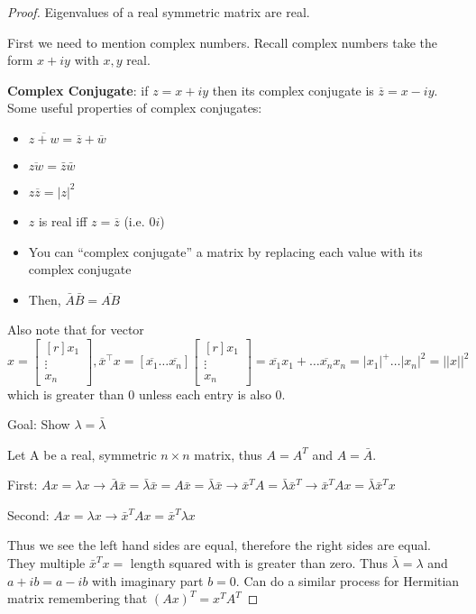 \begin{proof}
    Eigenvalues of a real symmetric matrix are real.

    First we need to mention complex numbers. Recall complex numbers take the form $x+iy$ with $x,y$ real.

    \begin{definition}
        \textbf{Complex Conjugate}: if $z=x+iy$ then its complex conjugate is $ \overline{z}=x-iy$. Some useful properties of complex conjugates:
        \begin{itemize}
            \item $\overline{z+w}= \overline{z}+ \overline{w}$
            \item $\overline{zw}= \bar{z} \bar{w}$
            \item $z \overline{z}=|z|^2$
            \item $z$ is real iff $z= \overline{z}$ (i.e. $0i$)
            \item You can ``complex conjugate'' a matrix by replacing each value with its complex conjugate
            \item Then, $ \bar{A} \bar{B}=\overline{AB}$
        \end{itemize}
    \end{definition}

    Also note that for vector $x=\begin{bmatrix}[r]
     x_1 \\
     \vdots \\
     x_n
    \end{bmatrix},  \overline{x}^\intercal x = [ \overline{x_1} \dots  \overline{x_n}] \begin{bmatrix}[r]
     x_1 \\
     \vdots \\
     x_n
 \end{bmatrix} =  \overline{x_1}x_1+\dots  \overline{x_n}x_n=|x_1|^+\dots|x_n|^2=||x||^2$ which is greater than 0 unless each entry is also 0.

Goal: Show $\lambda = \bar{\lambda}$

Let A be a real, symmetric $n \times n$ matrix, thus $A=A^T$ and $A=\bar{A}$.

First: $Ax=\lambda x \rightarrow \bar{A}\bar{x}=\bar{\lambda}\bar{x} = A\bar{x}=\bar{\lambda}\bar{x} \rightarrow \bar{x}^TA=\bar{\lambda}\bar{x}^T \rightarrow  \bar{x}^TAx=\bar{\lambda}\bar{x}^Tx$

Second: $Ax=\lambda x \rightarrow \bar{x}^TAx=\bar{x}^T\lambda x$

Thus we see the left hand sides are equal, therefore the right sides are equal. They multiple $\bar{x}^Tx =$ length squared with is greater than zero. Thus $\bar{\lambda}=\lambda$ and $a+ib=a-ib$ with imaginary part $b=0$. Can do a similar process for Hermitian matrix remembering that $(Ax)^T = x^TA^T$
\end{proof}


